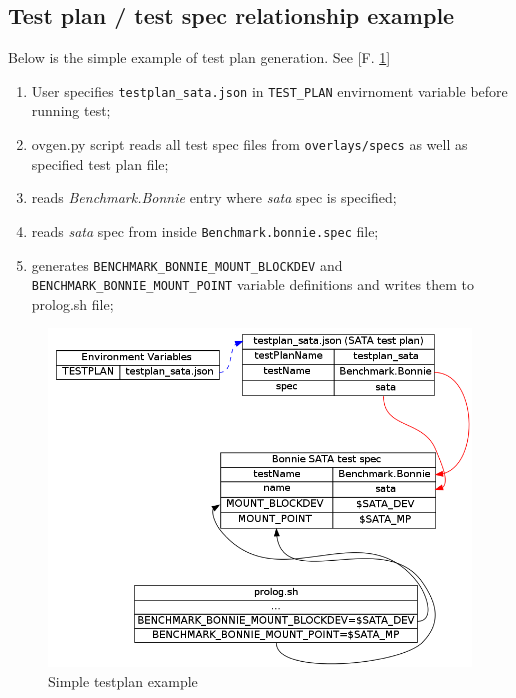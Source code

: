  \subsection{Test plan / test spec relationship example}
  \label{sec:tp_example}

  Below is the simple example of test plan generation. See [F. \ref{fig:tp_example}]

  \begin{enumerate}
  \item User specifies \texttt{testplan\_sata.json} in \texttt{TEST\_PLAN} envirnoment variable  before running test;

  \item ovgen.py script reads all test spec files from
    \texttt{overlays/specs} as well as specified test plan file;

  \item reads \textit{Benchmark.Bonnie} entry where \textit{sata} spec is specified;

  \item reads \textit{sata} spec from inside  \texttt{Benchmark.bonnie.spec} file;

  \item generates  \texttt{BENCHMARK\_BONNIE\_MOUNT\_BLOCKDEV} and \texttt{BENCHMARK\_BONNIE\_MOUNT\_POINT} variable definitions and writes them to prolog.sh file;
  \end{enumerate}

  \begin{figure}[H]
  \includegraphics*[width=16cm]{testplans_example.png}
  \caption{Simple testplan example}
  \label{fig:tp_example}
\end{figure}


